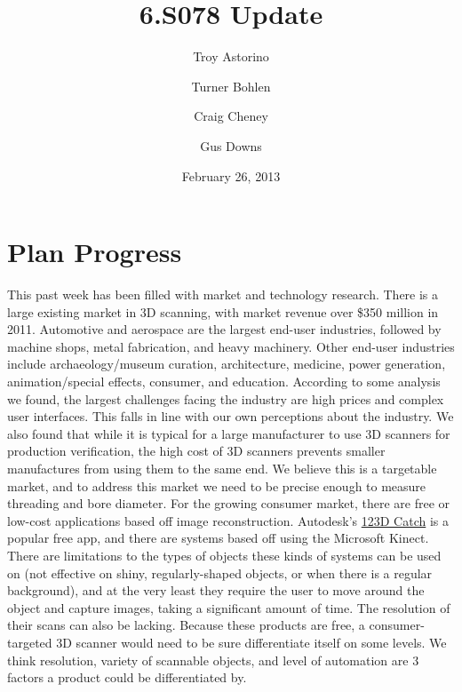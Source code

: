 \documentclass[10pt]{article}
\title{\vspace{-4em}6.S078 Update}
\author{Troy Astorino \and Turner Bohlen \and Craig Cheney \and Gus Downs}
\date{February 26, 2013}
\begin{document}
\maketitle
\vspace{-4em}

\section{Plan Progress}
This past week has been filled with market and technology research. There is a
large existing market in 3D scanning, with market revenue over \$350 million in
2011. Automotive and aerospace are the largest end-user industries, followed by
machine shops, metal fabrication, and heavy machinery. Other end-user industries
include archaeology/museum curation, architecture, medicine, power generation,
animation/special effects, consumer, and education. According to some analysis
we found, the largest challenges facing the industry are high prices and complex
user interfaces. This falls in line with our own perceptions about the industry.
We also found that while it is typical for a large manufacturer to use 3D
scanners for production verification, the high cost of 3D scanners prevents
smaller manufactures from using them to the same end. We believe this is a
targetable market, and to address this market we need to be precise enough to
measure threading and bore diameter. For the growing consumer market, there are
free or low-cost applications based off image reconstruction. Autodesk's
\href{http://www.123dapp.com/catch}{123D Catch} is a popular free app, and there
are systems based off using the Microsoft Kinect. There are limitations to the
types of objects these kinds of systems can be used on (not effective on shiny,
regularly-shaped objects, or when there is a regular background), and at the
very least they require the user to move around the object and capture images,
taking a significant amount of time. The resolution of their scans can also be
lacking. Because these products are free, a consumer-targeted 3D scanner would
need to be sure differentiate itself on some levels. We think resolution,
variety of scannable objects, and level of automation are 3 factors a product
could be differentiated by.
\end{document}
